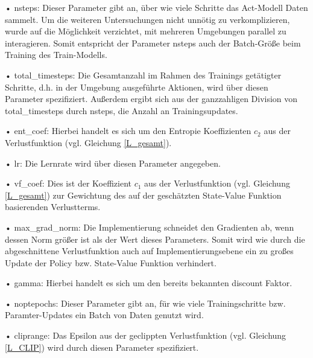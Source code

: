 \begin{description}
	\item • nsteps: Dieser Parameter gibt an, über wie viele Schritte das Act-Modell Daten sammelt. Um die weiteren Untersuchungen nicht unnötig zu verkomplizieren, wurde auf die Möglichkeit verzichtet, mit mehreren Umgebungen parallel zu interagieren. Somit entspricht der Parameter nsteps auch der Batch-Größe beim Training des Train-Modells.
	\item • total\_timesteps: Die Gesamtanzahl im Rahmen des Trainings getätigter Schritte, d.h. in der Umgebung ausgeführte Aktionen, wird über diesen Parameter spezifiziert. Außerdem ergibt sich aus der ganzzahligen Division von total\_timesteps durch nsteps, die Anzahl an Trainingsupdates.
	\item • ent\_coef: Hierbei handelt es sich um den Entropie Koeffizienten $c_2$ aus der Verlustfunktion (vgl. Gleichung \eqref{L_gesamt}).
	\item • lr: Die Lernrate wird über diesen Parameter angegeben.
	\item • vf\_coef: Dies ist der Koeffizient $c_1$ aus der Verlustfunktion (vgl. Gleichung \eqref{L_gesamt}) zur Gewichtung des auf der geschätzten State-Value Funktion basierenden Verlustterms.
	\item • max\_grad\_norm: Die Implementierung schneidet den Gradienten ab, wenn dessen Norm größer ist als der Wert dieses Parameters. Somit wird wie durch die abgeschnittene Verlustfunktion auch auf Implementierungsebene ein zu großes Update der Policy bzw. State-Value Funktion verhindert.
	\item • gamma: Hierbei handelt es sich um den bereits bekannten discount Faktor.
	\item • noptepochs: Dieser Parameter gibt an, für wie viele Trainingschritte bzw. Paramter-Updates ein Batch von Daten genutzt wird.
	\item • cliprange: Das Epsilon aus der  geclippten Verlustfunktion (vgl. Gleichung \eqref{L_CLIP}) wird durch diesen Parameter spezifiziert.
\end{description}

